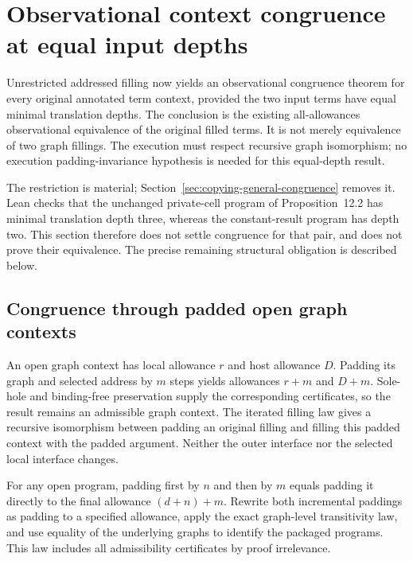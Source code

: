 \clearpage
\section{Observational context congruence at equal input depths}
\label{sec:copying-term-congruence}
Unrestricted addressed filling now yields an observational congruence theorem
for every original annotated term context, provided the two input terms have
equal minimal translation depths. The conclusion is the existing
all-allowances observational equivalence of the original filled terms. It is
not merely equivalence of two graph fillings. The execution must respect
recursive graph isomorphism; no execution padding-invariance hypothesis is
needed for this equal-depth result.

The restriction is material; Section~\ref{sec:copying-general-congruence} removes it. Lean checks that the unchanged private-cell
program of Proposition~12.2 has minimal translation depth three, whereas the
constant-result program has depth two. This section therefore does not settle
congruence for that pair, and does not prove their equivalence. The precise
remaining structural obligation is described below.

\subsection{Congruence through padded open graph contexts}

An open graph context has local allowance $r$ and host allowance $D$.
Padding its graph and selected address by $m$ steps yields allowances $r+m$
and $D+m$. Sole-hole and binding-free preservation supply the corresponding
certificates, so the result remains an admissible graph context. The iterated
filling law gives a recursive isomorphism between padding an original filling
and filling this padded context with the padded argument. Neither the outer
interface nor the selected local interface changes.




For any open program, padding first by $n$ and then by $m$ equals padding it
directly to the final allowance $(d+n)+m$. Rewrite both incremental paddings
as padding to a specified allowance, apply the exact graph-level transitivity
law, and use equality of the underlying graphs to identify the packaged
programs. This law includes all admissibility certificates by proof irrelevance.


